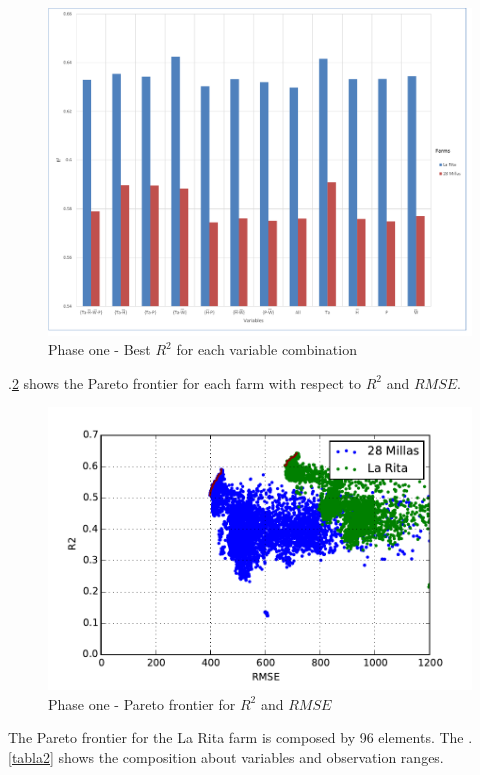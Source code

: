 \documentclass[review]{elsarticle}
\begin{document}
\begin{figure}[H] 
 \centering
 \includegraphics[scale=.5]{Phase_one_Best_R2_for_variables}
 \caption{Phase one - Best $R^2$ for each variable combination} 
 \label{figura6} 
\end{figure}

\figurename $.$\ref{figura7} shows the Pareto frontier for each farm with respect to $R^2$ and $RMSE$. 

\begin{figure}[H] 
 \centering
 \includegraphics[scale=.8]{Phase_one_R2_RMSE}
 \caption{Phase one - Pareto frontier for $R^2$ and $RMSE$} 
 \label{figura7} 
\end{figure}

The Pareto frontier for the La Rita farm is composed by 96 elements. The \tablename $.$\ref{tabla2} shows the composition about variables and observation ranges.
\end{document}
